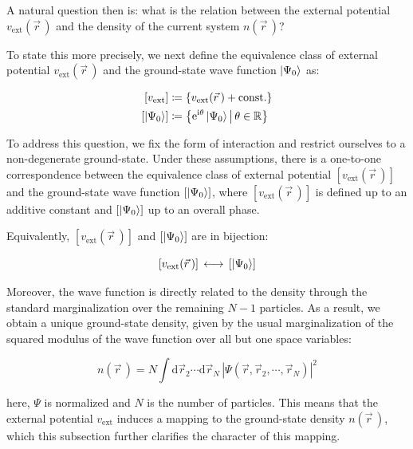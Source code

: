 A natural question then is: what is the relation between the external potential $v_\mathrm{ext}(\vec{r}\,)$ and the density of the current system $n(\vec{r}\,)$?

To state this more precisely, we next define the equivalence class of external potential $v_\mathrm{ext}(\vec{r}\,)$ and the ground-state wave function $\ket{\Psi_0}$ as:

\begin{equation}
\begin{aligned}
    \left[v_\mathrm{ext}\right]&\coloneqq\left\{ v_\mathrm{ext}(\vec{r}\,) +\mathrm{const.}\right\}\\
    \left[\ket{\Psi_0}\right]&\coloneqq\left\{\mathrm{e}^{\mathrm{i}\theta}\ket{\Psi_0} \,\middle|\,\theta\in\mathbb{R}\right\}
\end{aligned}
\label{equivalence_classes_definition}
\end{equation}

To address this question, we fix the form of interaction and restrict ourselves to a non-degenerate ground-state.
Under these assumptions, there is a one-to-one correspondence between the equivalence class of external potential $\left[v_\mathrm{ext}(\vec{r}\,)\right]$ and the ground-state wave function $\left[\ket{\Psi_0}\right]$, 
where $\left[v_\mathrm{ext}(\vec{r}\,)\right]$ is defined up to an additive constant and $\left[\ket{\Psi_0}\right]$ up to an overall phase.

Equivalently, $\left[v_\mathrm{ext}(\vec{r}\,)\right]$ and $\left[\ket{\Psi_0}\right]$ are in bijection:

\begin{equation}
    \left[v_\mathrm{ext}(\vec{r}\,)\right]\,\longleftrightarrow\,\left[\ket{\Psi_0}\right]
\label{potential_wave_function_correspondence}
\end{equation}

Moreover, the wave function is directly related to the density through the standard marginalization over the remaining $N-1$ particles. As a result, we obtain a unique ground-state density, given by the usual marginalization of the squared modulus of the wave function over all but one space variables:

\begin{equation}
    n(\vec{r}\,)=N\int \mathrm{d}\vec{r}_2\cdots\mathrm{d}\vec{r}_N\,\left|\Psi(\vec{r},\vec{r}_2,\cdots,\vec{r}_N)\right|^2
\label{density_function}
\end{equation}

here, $\Psi$ is normalized and $N$ is the number of particles.
This means that the external potential $v_\mathrm{ext}$ induces a mapping to the ground-state density $n(\vec r\,)$, which this subsection further clarifies the character of this mapping.

